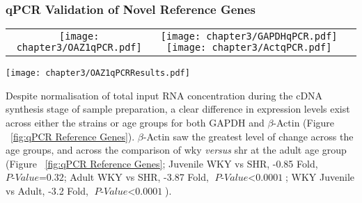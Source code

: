 \subsubsection{qPCR Validation of Novel Reference Genes}

\begin{figure*}[!hbtp]
\centering
\begin{tabular}{ccc}
  \texttt{[image: chapter3/OAZ1qPCR.pdf]} & \texttt{[image: chapter3/GAPDHqPCR.pdf]} \texttt{[image: chapter3/ActqPCR.pdf]} \\
\end{tabular}
\caption[qPCR Blood Expression of Putative reference genes and the novel Oaz1 reference gene across \acrfull{wky} and \acrfull{shr}]{qPCR Blood Expression of Putative reference genes and the novel Oaz1 reference gene across \acrfull{wky} and \acrfull{shr}. Expression is displayed here as $2^{-\Delta C_{T}}$ normalised values for GAPDH, $\beta$-Actin, and the novel Oaz1 reference gene, in addition to the \acrfull{sem} for juvenile and adult strains. Statistical analysis made use of two-way \acrfull{anova} with Tukey's multiple test correction. (P-Value $<$0.05, *; $<$0.01, **; $<$0.001, ***).}
\label{fig:qPCR Reference Genes}
\end{figure*}

\begin{figure*}[!hbtp]
\centering
\texttt{[image: chapter3/OAZ1qPCRResults.pdf]}
\caption[Rescaled plot of Oaz1 expression in Blood]{Rescaled qPCR Blood Expression of Oaz1 reference gene across \acrfull{wky} and \acrfull{shr}. Expression is displayed here as $2^{-\Delta C_{T}}$ normalised values for Oaz1 reference, in addition to the \acrfull{sem} for juvenile and adult strains.Statistical analysis made use of two-way \acrfull{anova} with Tukey's multiple test correction. (P-Value $<$0.05, *; $<$0.01, **; $<$0.001, ***).}
\label{fig:OAZ1 Expression}
\end{figure*}

Despite normalisation of total input RNA concentration during the cDNA synthesis stage of sample preparation, a clear difference in expression levels exist across either the strains or age groups for both GAPDH and $\beta$-Actin (Figure ~\ref{fig:qPCR Reference Genes}). $\beta$-Actin saw the greatest level of change across the age groups, and across the comparison of \acrfull{wky} \textit{versus} \acrfull{shr} at the adult age group (Figure ~\ref{fig:qPCR Reference Genes}; Juvenile WKY vs SHR, -0.85 Fold, $\textit{P-Value=0.32}$; Adult WKY vs SHR, -3.87 Fold, $\textit{P-Value$<$0.0001}$; WKY Juvenile vs Adult, -3.2 Fold, $\textit{P-Value$<$0.0001}$). 

